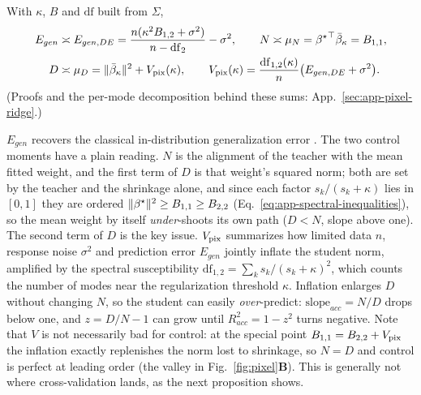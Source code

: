 \begin{prop}\label{prop:pixel-de}
With $\kappa$, $B$ and $\mathrm{df}$ built from $\Sigma$,
\begin{equation}
\begin{aligned}
E_{gen}&\asymp E_{gen,DE}=\frac{n(\kappa^2B_{1,2}+\sigma^2)}{n-\mathrm{df}_2}-\sigma^2,\qquad
N\asymp \mu_N={\beta^{\star}}^\top\bar\beta_\kappa=B_{1,1},\\
D&\asymp \mu_D=\|\bar\beta_\kappa\|^2+V_{\rm pix}(\kappa),
\qquad
V_{\rm pix}(\kappa)=\frac{\mathrm{df}_{1,2}(\kappa)}{n}\big(E_{gen,DE}+\sigma^2\big).
\end{aligned}
\label{eq:pixel-de}
\end{equation}
(Proofs and the per-mode decomposition behind these sums: App.~\ref{sec:app-pixel-ridge}.)
\end{prop}
$E_{gen}$ recovers the classical in-distribution generalization error \citep{dobriban2018high,hastie2022surprises}. The two control moments have a plain reading. $N$ is the alignment of the teacher with the mean fitted weight, and the first term of $D$ is that weight's squared norm; both are set by the teacher and the shrinkage alone, and since each factor $s_k/(s_k+\kappa)$ lies in $[0,1]$ they are ordered $\|{\beta^{\star}}\|^2\ge B_{1,1}\ge B_{2,2}$ (Eq.~\ref{eq:app-spectral-inequalities}), so the mean weight by itself \emph{under}-shoots its own path ($D<N$, slope above one). The second term of $D$ is the key issue. $V_{\rm pix}$ summarizes how limited data $n$, response noise $\sigma^2$ and prediction error $E_{gen}$ jointly inflate the student norm, amplified by the spectral susceptibility $\mathrm{df}_{1,2}=\sum_ks_k/(s_k+\kappa)^2$, which counts the number of modes near the regularization threshold $\kappa$.
Inflation enlarges $D$ without changing $N$, so the student can easily \emph{over}-predict: $\mathrm{slope}_{acc}=N/D$ drops below one, and $z=D/N-1$ can grow until $R^2_{acc}=1-z^2$ turns negative.
Note that $V$ is not necessarily bad for control: at the special point $B_{1,1}=B_{2,2}+V_{\rm pix}$ the inflation exactly replenishes the norm lost to shrinkage, so $N=D$ and control is perfect at leading order (the valley in Fig.~\ref{fig:pixel}\textbf{B}).
This is generally not where cross-validation lands, as the next proposition shows.


